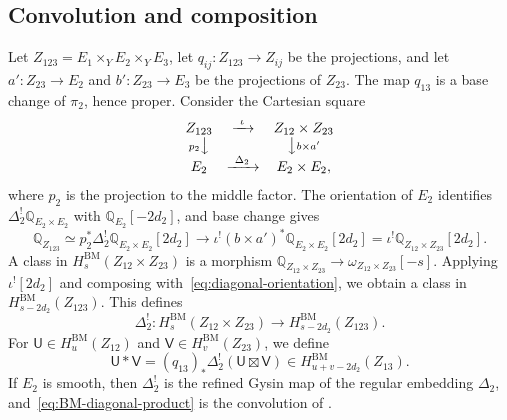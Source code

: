 \documentclass[11pt,a4paper]{amsart}
\theoremstyle{definition}
\theoremstyle{remark}
\newcommand{\Q}{\mathbb Q}
\newcommand{\BM}{\mathrm{BM}}
\numberwithin{equation}{section}
\begin{document}
\subsection{Convolution and composition}
\label{sec:BM-product}
Let $Z_{123}=E_1\times_YE_2\times_YE_3$, let
$q_{ij}:Z_{123}\to Z_{ij}$ be the projections, and let
$a':Z_{23}\to E_2$ and $b':Z_{23}\to E_3$ be the projections of $Z_{23}$.
The map $q_{13}$ is a base change of $\pi_2$, hence proper. Consider the
Cartesian square
$$
\begin{array}{ccc}
Z_{123}&\xrightarrow{\ \iota\ }&Z_{12}\times Z_{23}\\
{\scriptstyle p_2}\big\downarrow&&\big\downarrow{\scriptstyle b\times a'}\\
E_2&\xrightarrow{\ \Delta_2\ }&E_2\times E_2,
\end{array}
$$
where $p_2$ is the projection to the middle factor. The orientation of
$E_2$ identifies $\Delta_2^!\Q_{E_2\times E_2}$ with $\Q_{E_2}[-2d_2]$,
and base change gives
\begin{equation}\label{eq:diagonal-orientation}
\Q_{Z_{123}}\simeq p_2^*\Delta_2^!\Q_{E_2\times E_2}[2d_2]
\longrightarrow\iota^!(b\times a')^*\Q_{E_2\times E_2}[2d_2]
=\iota^!\Q_{Z_{12}\times Z_{23}}[2d_2].
\end{equation}
A class in $H^{\BM}_s(Z_{12}\times Z_{23})$ is a morphism
$\Q_{Z_{12}\times Z_{23}}\to\omega_{Z_{12}\times Z_{23}}[-s]$. Applying
$\iota^![2d_2]$ and composing with~\eqref{eq:diagonal-orientation}, we
obtain a class in $H^{\BM}_{s-2d_2}(Z_{123})$. This defines
$$
\Delta_2^!:H^{\BM}_s(Z_{12}\times Z_{23})\longrightarrow
H^{\BM}_{s-2d_2}(Z_{123}).
$$
For $\mathsf U\in H^{\BM}_u(Z_{12})$ and $\mathsf V\in H^{\BM}_v(Z_{23})$,
we define
\begin{equation}\label{eq:BM-diagonal-product}
\mathsf U*\mathsf V=(q_{13})_*\Delta_2^!(\mathsf U\boxtimes\mathsf V)
\in H^{\BM}_{u+v-2d_2}(Z_{13}).
\end{equation}
If $E_2$ is smooth, then $\Delta_2^!$ is the refined Gysin map of the
regular embedding $\Delta_2$, and~\eqref{eq:BM-diagonal-product} is the
convolution of \cite[Sections~2.6--2.7]{CG}.
\end{document}
